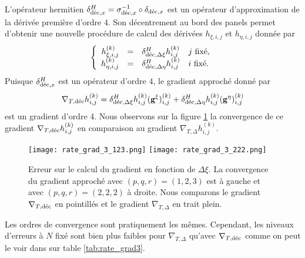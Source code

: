 L'opérateur hermitien $\delta^H_{\dec,x} = \sigma_{\dec,x}^{-1} \circ \delta_{\dec,x}$ est un opérateur d'approximation de la dérivée première d'ordre 4. Son décentrement au bord des panels permet d'obtenir une nouvelle procédure de calcul des dérivées $h_{\xi,i,j}$ et $h_{\eta,i,j}$ donnée par 
\begin{equation}
\left\lbrace
\begin{array}{rcll}
h_{\xi,i,j}^{(k)} & = & \delta^H_{\dec,\Delta \xi} h_{i,j}^{(k)} & j \text{ fixé,}\\
h_{\eta,i,j}^{(k)} & = & \delta^H_{\dec,\Delta \eta} h_{i,j}^{(k)} & i \text{ fixé.}
\end{array}
\right.
\end{equation}
Puisque $\delta^H_{\dec,x}$ est un opérateur d'ordre $4$, le gradient approché donné par 
\begin{equation}
\nabla_{T,\dec} h_{i,j}^{(k)} = \delta^H_{\dec,\Delta \xi} h_{i,j}^{(k)} ( \mathbf{g}^{\xi} )_{i,j}^{(k)} + \delta^H_{\dec,\Delta \eta} h_{i,j}^{(k)} ( \mathbf{g}^{\eta} )_{i,j}^{(k)}
\end{equation}
est un gradient d'ordre 4.
Nous observons sur la figure \ref{fig:rate_grad3} la convergence de ce gradient $\nabla_{T,\dec} h_{i,j}^{(k)}$ en comparaison au gradient $\nabla_{T,\Delta} h_{i,j}^{(k)}$.
\begin{figure}[htbp]
\begin{center}
\texttt{[image: rate\_grad\_3\_123.png]}
\texttt{[image: rate\_grad\_3\_222.png]}
\end{center}
\caption{Erreur sur le calcul du gradient en fonction de $\Delta \xi$. La convergence du gradient approché avec $(p,q,r)=(1,2,3)$ est à gauche et avec $(p,q,r)=(2,2,2)$ à droite. Nous comparons le gradient $\nabla_{T,\dec}$ en pointillés et le gradient $\nabla_{T,\Delta}$ en trait plein.}
\label{fig:rate_grad3}
\end{figure}
Les ordres de convergence sont pratiquement les mêmes. Cependant, les niveaux d'erreurs à $N$ fixé sont bien plus faibles pour $\nabla_{T,\Delta}$ qu'avec $\nabla_{T,\dec}$ comme on peut le voir dans sur table \ref{tab:rate_grad3}.


